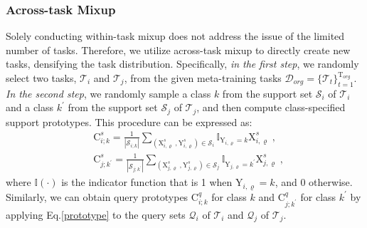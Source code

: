 \subsubsection{Across-task Mixup} 
Solely conducting within-task mixup does not address the issue of the limited number of tasks. Therefore, we utilize across-task mixup to directly create new tasks, densifying the task distribution. Specifically, \textit{in the first step}, we randomly select two tasks, $\mathcal{T}_i$ and $\mathcal{T}_j$, from the given meta-training tasks $\mathcal{D}_{org}\!=\!\{\mathcal{T}_t\}_{t=1}^{\mathrm{T}_{org}}$. \textit{In the second step}, we randomly sample a class $k$ from the support set $\mathcal{S}_i$ of $\mathcal{T}_i$ and a class $k^\prime$ from the support set $\mathcal{S}_j$ of $\mathcal{T}_j$, and then compute class-specified support prototypes. This procedure can be expressed as:
\begin{equation}
\label{prototype}
    \begin{aligned}
        &\mathrm{C}_{i;k}^s\!=\!\frac{1}{|\mathcal{S}_{i;k}|}\sum_{(\mathrm{X}_{i,\varrho}^s\;,\mathrm{Y}_{i,\varrho}^s)\in\mathcal{S}_{i}}\mathbb{I}_{\mathrm{Y}_{i,\varrho}=k}\mathrm{X}_{i,\varrho}^s \;, \\ &\mathrm{C}_{j;k^\prime}^s\!=\!\frac{1}{|\mathcal{S}_{j;k^\prime}|}\sum_{(\mathrm{X}_{j,\varrho}^s\;,\mathrm{Y}_{j,\varrho}^s)\in\mathcal{S}_{j}}\mathbb{I}_{\mathrm{Y}_{j,\varrho}=k^\prime}\mathrm{X}_{j,\varrho}^s\;,
    \end{aligned}
\end{equation}
where $\mathbb I(\cdot)$ is the indicator function that is 1 when $\mathrm{Y}_{i,\varrho}\!=\!k$, and 0 otherwise. Similarly, we can obtain query prototypes $\mathrm{C}_{i;k}^q$ for class $k$ and $\mathrm{C}_{j;k^\prime}^q$ for class $k^\prime$ by applying Eq.\ref{prototype} to the query sets $\mathcal{Q}_i$ of $\mathcal{T}_i$ and $\mathcal{Q}_j$ of $\mathcal{T}_j$.

